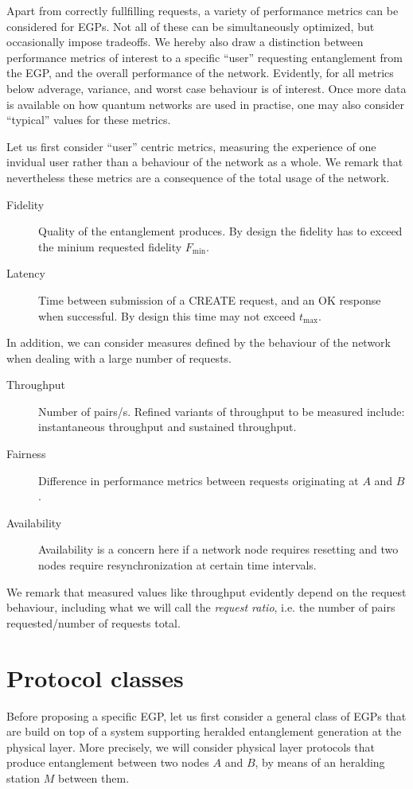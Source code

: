 \documentclass{article}
\begin{document}
Apart from correctly fullfilling requests, a variety of performance metrics can be considered for EGPs. Not all of these can be simultaneously optimized, but occasionally impose tradeoffs.
We hereby also draw a distinction between performance metrics of interest to a specific ``user'' requesting entanglement from the EGP, and the overall performance of the network. 
Evidently, for all metrics below adverage, variance, and worst case behaviour is of interest. Once more data is available on how quantum networks are used in practise, one may also consider ``typical'' values for these metrics.

Let us first consider ``user'' centric metrics, measuring the experience of one invidual user rather than a behaviour of the network as a whole. We remark that nevertheless these metrics
are a consequence of the total usage of the network.
\begin{description}
\item[Fidelity] Quality of the entanglement produces. By design the fidelity has to exceed the minium requested fidelity $F_{\min}$. 
\item[Latency] Time between submission of a CREATE request, and an OK response when successful. By design this time may not exceed $t_{\max}$.
\end{description}
In addition, we can consider measures defined by the behaviour of the network when dealing with a large number of requests.
\begin{description}
\item[Throughput] Number of pairs/s. Refined variants of throughput to be measured include: instantaneous throughput and sustained throughput.
\item[Fairness] Difference in performance metrics between requests originating at $A$ and $B$.
\item[Availability] Availability is a concern here if a network node requires resetting and two nodes require resynchronization at certain time intervals.
\end{description}
We remark that measured values like throughput evidently depend on the request behaviour, including what we will call the \emph{request ratio}, i.e. the number of pairs requested/number of requests total. 

\section{Protocol classes}
Before proposing a specific EGP, let us first consider a general class of EGPs that are build 
on top of a system supporting heralded entanglement generation at the physical layer. 
More precisely, we will consider physical layer protocols that  produce entanglement between two nodes $A$ and $B$, by means of an heralding station $M$ between them. 
\smallskip
\begin{sequencediagram}
\end{sequencediagram}
\end{document}

